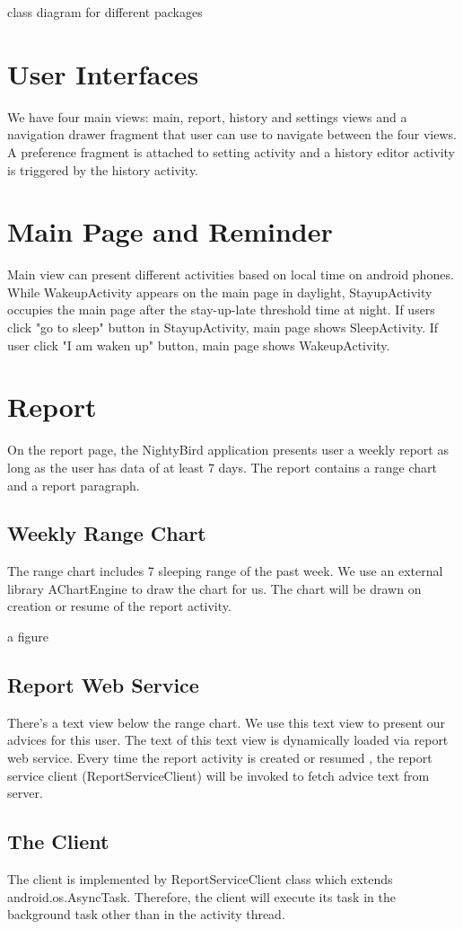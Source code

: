\documentclass[14pt]{extreport}
\begin{document}
class diagram for different packages

\chapter{User Interfaces}
We have four main views: main, report, history and settings views and a navigation drawer fragment that user can use to navigate between the four views. A preference fragment is attached to setting activity and a history editor activity is triggered by the history activity. 

\chapter{Main Page and Reminder}
Main view can present different activities based on local time on android phones. While WakeupActivity appears on the main page in daylight, StayupActivity occupies the main page after the stay-up-late threshold time at night. If users click "go to sleep" button in StayupActivity, main page shows SleepActivity. If user click "I am waken up" button, main page shows WakeupActivity. 

\chapter{Report}
On the report page, the NightyBird application presents user a weekly report as long as the user has data of at least 7 days. The report contains a range chart and a report paragraph.
\section{Weekly Range Chart}
The range chart includes 7 sleeping range of the past week. We use an external library AChartEngine to draw the chart for us. The chart will be drawn on creation or resume of the report activity.

a figure

\section{Report Web Service}
There's a text view below the range chart. We use this text view to present our advices for this user. The text of this text view is dynamically loaded via report web service. Every time the report activity is created or resumed , the report service client (ReportServiceClient) will be invoked to fetch advice text from server. 

\section{The Client}
The client is implemented by ReportServiceClient class which extends android.os.AsyncTask. Therefore, the client will execute its task in the background task other than in the activity thread.
\end{document}
